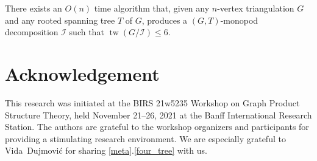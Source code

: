 \documentclass{patmorin}
\DeclareMathOperator{\tw}{tw}
\begin{document}
\begin{thm}\label{monopod_decomposition_algorithm}
  There exists an $O(n)$ time algorithm that, given any $n$-vertex triangulation $G$ and any rooted spanning tree $T$ of $G$, produces a $(G,T)$-monopod decomposition $\mathcal{I}$ such that $\tw(G/\mathcal{I})\le 6$.
\end{thm}




\section*{Acknowledgement}

This research was initiated at the BIRS 21w5235 Workshop on Graph Product Structure Theory, held November 21--26, 2021 at the Banff International Research Station.  The authors are grateful to the workshop organizers and participants for providing a stimulating research environment.  We are especially grateful to Vida~Dujmović for sharing \cref{meta}.\ref{four_tree} with us.




\end{document}
